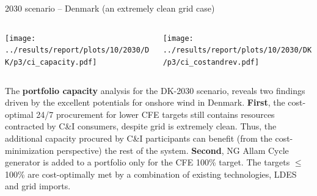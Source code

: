   \begin{frame}{2030 scenario -- Denmark (an extremely clean grid case)}
  
    {\footnotesize
  
    \begin{columns}
    \begin{column}{7cm}
    \centering
    \texttt{[image: ../results/report/plots/10/2030/DK/p3/ci\_capacity.pdf]}
    \end{column}
  
    \begin{column}{8cm}
    \centering
    \texttt{[image: ../results/report/plots/10/2030/DK/p3/ci\_costandrev.pdf]}
    \end{column}
  
    \end{columns}
  
    \begin{columns}
    \begin{column}{15cm}
    The {\bf portfolio capacity} analysis for the DK-2030 scenario,
    reveals two findings driven by the excellent potentials for onshore wind in Denmark.
    {\bf First}, the cost-optimal 24/7 procurement for lower CFE targets
    still contains resources contracted by C\&I consumers, despite grid is extremely clean.
    Thus, the additional capacity procured by C\&I participants can benefit 
    (from the cost-minimization perspective) the rest of the system.
    {\bf Second}, NG Allam Cycle generator is added to a portfolio \alert{only for the CFE 100\% target}. 
    The targets $\leq$100\% are cost-optimally met by a combination of existing technologies, LDES and grid imports. 
      
    \end{column}
    \end{columns}
    }
  
  \end{frame}






